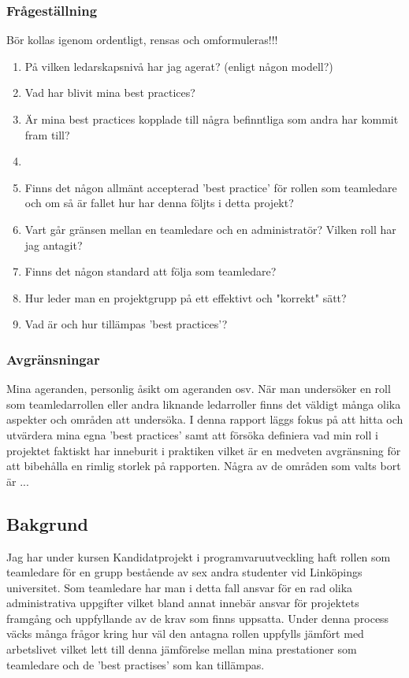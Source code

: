 \subsubsection{Frågeställning}
Bör kollas igenom ordentligt, rensas och omformuleras!!!
	\begin{enumerate}
		\item På vilken ledarskapsnivå har jag agerat? (enligt någon modell?)
		\item Vad har blivit mina best practices?
		\item Är mina best practices kopplade till några befinntliga som andra har kommit fram till?
		\item
		\item Finns det någon allmänt accepterad 'best practice' för rollen som teamledare och om så är fallet hur har denna följts i detta projekt?
		\item Vart går gränsen mellan en teamledare och en administratör? Vilken roll har jag antagit?
		\item Finns det någon standard att följa som teamledare?
		\item Hur leder man en projektgrupp på ett effektivt och "korrekt" sätt?
		\item Vad är och hur tillämpas 'best practices'?
	\end{enumerate}
	
\subsubsection{Avgränsningar}
Mina ageranden, personlig åsikt om ageranden osv. \newline
När man undersöker en roll som teamledarrollen eller andra liknande ledarroller finns det väldigt många olika aspekter och områden att undersöka. I denna rapport läggs fokus på att hitta och utvärdera mina egna 'best practices' samt att försöka definiera vad min roll i projektet faktiskt har inneburit i praktiken vilket är en medveten avgränsning för att bibehålla en rimlig storlek på rapporten.
\newline \newline
Några av de områden som valts bort är ...

\subsection{Bakgrund}
Jag har under kursen Kandidatprojekt i programvaruutveckling haft rollen som teamledare för en grupp bestående av sex andra studenter vid Linköpings universitet. Som teamledare har man i detta fall ansvar för en rad olika administrativa uppgifter vilket bland annat innebär ansvar för projektets framgång och uppfyllande av de krav som finns uppsatta. 
\newline \newline
Under denna process väcks många frågor kring hur väl den antagna rollen uppfylls jämfört med arbetslivet vilket lett till denna jämförelse mellan mina prestationer som teamledare och de 'best practises' som kan tillämpas.

